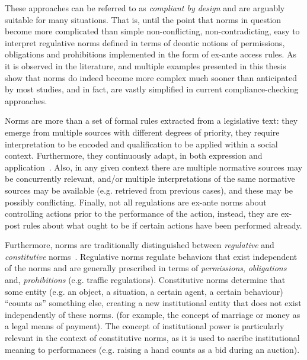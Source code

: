 These approaches can be referred to as \textit{compliant by design} and are arguably suitable for many situations. That is, until the point that norms in question become more complicated than simple non-conflicting, non-contradicting, easy to interpret regulative norms defined in terms of deontic notions of permissions, obligations and prohibitions implemented in the form of ex-ante access rules. As it is observed in the literature, and multiple examples presented in this thesis show that norms do indeed become more complex much sooner than anticipated by most studies, and in fact, are vastly simplified in current compliance-checking approaches. 


Norms are more than a set of formal rules extracted from a legislative text: they emerge from multiple sources with different degrees of priority, they require interpretation to be encoded and qualification to be applied within a social context. Furthermore, they continuously adapt, in both expression and application~\cite{Boella2014APractice}. Also, in any given context there are multiple normative sources may be concurrently relevant, and/or multiple interpretations of the same normative sources may be available (e.g. retrieved from previous cases), and these may be possibly conflicting. Finally, not all regulations are ex-ante norms about controlling actions prior to the performance of the action, instead, they are ex-post rules about what ought to be if certain actions have been performed already.%


Furthermore, norms are traditionally distinguished between \textit{regulative} and \textit{constitutive} norms~\cite{Searle1969,Boella2004RegulativeSystems,Sileno2015}. Regulative norms regulate behaviors that exist independent of the norms and are generally prescribed in terms of \textit{permissions}, \textit{obligations} and, \textit{prohibitions} (e.g. traffic regulations). Constitutive norms determine that some entity (e.g. an object, a situation, a certain agent, a certain behaviour) ``counts as'' something else, creating a new institutional entity that does not exist independently of these norms. (for example, the concept of marriage or money as a legal means of payment). The concept of institutional power is particularly relevant in the context of constitutive norms, as it is used to ascribe institutional meaning to  performances (e.g. raising a hand counts as a bid during an auction).

